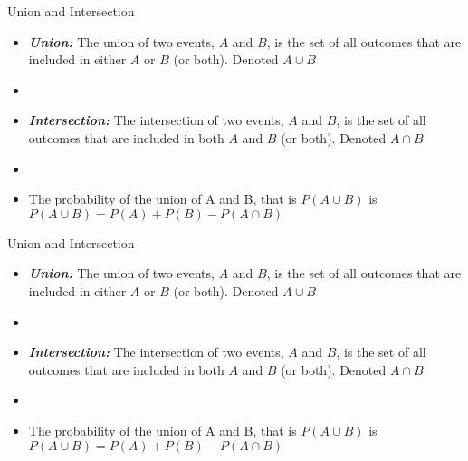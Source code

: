 \documentclass[xcolor=dvipsnames]{beamer}
\begin{document}
\begin{frame}{Union and Intersection}
	\begin{itemize}
		\item \textbf{\emph{Union:}} The union of two events, $A$ and $B$, is the set of all outcomes that are included in either $A$ or $B$ (or both). Denoted $A \cup B$
		\item[]
		\item \textbf{\emph{Intersection:}} The intersection of two events, $A$ and $B$, is the set of all outcomes that are included in both $A$ and $B$ (or both). Denoted $A \cap B$
		\item[]
		\item The probability of the union of A and B, that is $P(A\cup B)$ is $P(A \cup B) = P(A) + P(B) - P(A\cap B)$
	\end{itemize}
\end{frame}

\begin{frame}{Union and Intersection}
\begin{itemize}
	\item \textbf{\emph{Union:}} The union of two events, $A$ and $B$, is the set of all outcomes that are included in either $A$ or $B$ (or both). Denoted $A \cup B$
	\item[]
	\item \textbf{\emph{Intersection:}} The intersection of two events, $A$ and $B$, is the set of all outcomes that are included in both $A$ and $B$ (or both). Denoted $A \cap B$
	\item[]
	\item The probability of the union of A and B, that is $P(A\cup B)$ is $P(A \cup B) = P(A) + P(B) - P(A\cap B)$
\end{itemize}
\end{frame}
\end{document}
